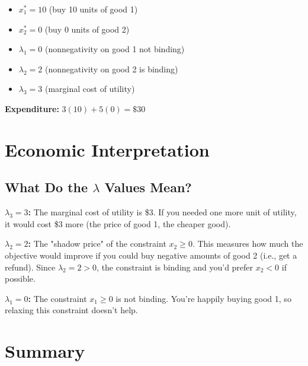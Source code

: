 \documentclass[11pt]{article}
\begin{document}
\begin{tcolorbox}[colback=green!5!white,colframe=green!75!black,title=Solution]
\begin{itemize}
\item $x_1^* = 10$ (buy 10 units of good 1)
\item $x_2^* = 0$ (buy 0 units of good 2)
\item $\lambda_1 = 0$ (nonnegativity on good 1 not binding)
\item $\lambda_2 = 2$ (nonnegativity on good 2 is binding)
\item $\lambda_3 = 3$ (marginal cost of utility)
\end{itemize}

\textbf{Expenditure:} $3(10) + 5(0) = \$30$
\end{tcolorbox}

\section{Economic Interpretation}

\subsection{What Do the $\lambda$ Values Mean?}

\textbf{$\lambda_3 = 3$:} The marginal cost of utility is \$3. If you needed one more unit of utility, it would cost \$3 more (the price of good 1, the cheaper good).

\textbf{$\lambda_2 = 2$:} The "shadow price" of the constraint $x_2 \geq 0$. This measures how much the objective would improve if you could buy negative amounts of good 2 (i.e., get a refund). Since $\lambda_2 = 2 > 0$, the constraint is binding and you'd prefer $x_2 < 0$ if possible.

\textbf{$\lambda_1 = 0$:} The constraint $x_1 \geq 0$ is not binding. You're happily buying good 1, so relaxing this constraint doesn't help.

\section{Summary}
\end{document}
